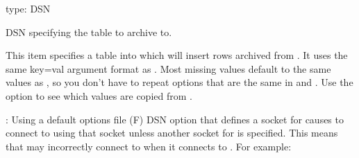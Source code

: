 \documentclass[letterpaper,10pt,english]{sphinxmanual}
\begin{document}
\begin{fulllineitems}
\label{\detokenize{mariadb-archiver:cmdoption-mariadb-archiver-dest}}
\sphinxAtStartPar
type: DSN

\sphinxAtStartPar
DSN specifying the table to archive to.

\sphinxAtStartPar
This item specifies a table into which  will insert rows
archived from {\hyperref[\detokenize{mariadb-archiver:cmdoption-mariadb-archiver-source}]{}}.  It uses the same key=val argument format as
{\hyperref[\detokenize{mariadb-archiver:cmdoption-mariadb-archiver-source}]{}}.  Most missing values default to the same values as
{\hyperref[\detokenize{mariadb-archiver:cmdoption-mariadb-archiver-source}]{}}, so you don’t have to repeat options that are the same in
{\hyperref[\detokenize{mariadb-archiver:cmdoption-mariadb-archiver-source}]{}} and {\hyperref[\detokenize{mariadb-archiver:cmdoption-mariadb-archiver-dest}]{}}.  Use the {\hyperref[\detokenize{mariadb-archiver:cmdoption-mariadb-archiver-help}]{}} option to see which values
are copied from {\hyperref[\detokenize{mariadb-archiver:cmdoption-mariadb-archiver-source}]{}}.

\sphinxAtStartPar
{}: Using a default options file (F) DSN option that defines a
socket for {\hyperref[\detokenize{mariadb-archiver:cmdoption-mariadb-archiver-source}]{}} causes  to connect to {\hyperref[\detokenize{mariadb-archiver:cmdoption-mariadb-archiver-dest}]{}} using
that socket unless another socket for {\hyperref[\detokenize{mariadb-archiver:cmdoption-mariadb-archiver-dest}]{}} is specified.  This
means that  may incorrectly connect to {\hyperref[\detokenize{mariadb-archiver:cmdoption-mariadb-archiver-source}]{}} when it
connects to {\hyperref[\detokenize{mariadb-archiver:cmdoption-mariadb-archiver-dest}]{}}.  For example:


\end{fulllineitems}
\end{document}
